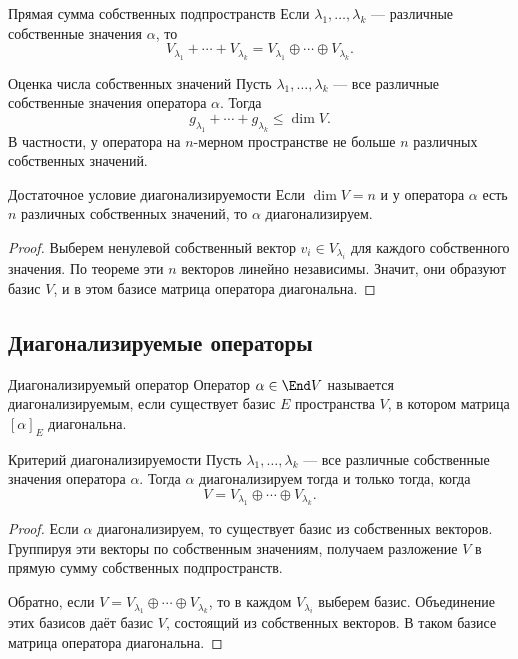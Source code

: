 \begin{Corollary}{Прямая сумма собственных подпространств}{}
	Если $\lambda_1,\ldots,\lambda_k$ --- различные собственные значения $\alpha$, то
	\[
	V_{\lambda_1}+\cdots+V_{\lambda_k}
	=
	V_{\lambda_1}\oplus\cdots\oplus V_{\lambda_k}.
	\]
\end{Corollary}

\begin{Corollary}{Оценка числа собственных значений}{}
	Пусть $\lambda_1,\ldots,\lambda_k$ --- все различные собственные значения оператора $\alpha$.
	Тогда
	\[
	g_{\lambda_1}+\cdots+g_{\lambda_k}\le \dim V.
	\]
	В частности, у оператора на $n$-мерном пространстве не больше $n$ различных собственных значений.
\end{Corollary}

\begin{Corollary}{Достаточное условие диагонализируемости}{}
	Если $\dim V=n$ и у оператора $\alpha$ есть $n$ различных собственных значений, то $\alpha$ диагонализируем.
\end{Corollary}

\begin{proof}
	Выберем ненулевой собственный вектор $v_i\in V_{\lambda_i}$ для каждого собственного значения.
	По теореме эти $n$ векторов линейно независимы.
	Значит, они образуют базис $V$, и в этом базисе матрица оператора диагональна.
\end{proof}

\subsection{Диагонализируемые операторы}

\begin{Definition}{Диагонализируемый оператор}{}
	Оператор $\alpha\in\End V$ называется диагонализируемым, если существует базис $E$ пространства $V$, в котором матрица $[\alpha]_E$ диагональна.
\end{Definition}

\begin{Theorem}{Критерий диагонализируемости}{}
	Пусть $\lambda_1,\ldots,\lambda_k$ --- все различные собственные значения оператора $\alpha$.
	Тогда $\alpha$ диагонализируем тогда и только тогда, когда
	\[
	V=V_{\lambda_1}\oplus\cdots\oplus V_{\lambda_k}.
	\]
\end{Theorem}

\begin{proof}
	Если $\alpha$ диагонализируем, то существует базис из собственных векторов.
	Группируя эти векторы по собственным значениям, получаем разложение $V$ в прямую сумму собственных подпространств.
	
	Обратно, если
	$V=V_{\lambda_1}\oplus\cdots\oplus V_{\lambda_k}$,
	то в каждом $V_{\lambda_i}$ выберем базис.
	Объединение этих базисов даёт базис $V$, состоящий из собственных векторов.
	В таком базисе матрица оператора диагональна.
\end{proof}


